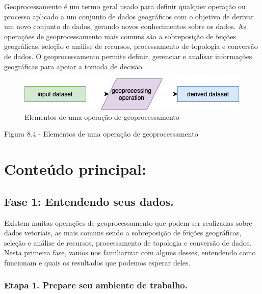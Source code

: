 \documentclass[
]{book}
\begin{document}
Geoprocessamento é um termo geral usado para definir qualquer operação ou processo aplicado a um conjunto de dados geográficos com o objetivo de derivar um novo conjunto de dados, gerando novos conhecimentos sobre os dados. As operações de geoprocessamento mais comuns são a sobreposição de feições geográficas, seleção e análise de recursos, processamento de topologia e conversão de dados. O geoprocessamento permite definir, gerenciar e analisar informações geográficas para apoiar a tomada de decisão.

\begin{figure}
\centering
\includegraphics{media/modulo8/fig84.png}
\caption{Elementos de uma operação de geoprocessamento}
\end{figure}

Figura 8.4 - Elementos de uma operação de geoprocessamento

\hypertarget{conteuxfado-principal-7}{%
\section{Conteúdo principal:}\label{conteuxfado-principal-7}}

\hypertarget{fase-1-entendendo-seus-dados.}{%
\subsection{Fase 1: Entendendo seus dados.}\label{fase-1-entendendo-seus-dados.}}

Existem muitas operações de geoprocessamento que podem ser realizadas sobre dados vetoriais, as mais comuns sendo a sobreposição de feições geográficas, seleção e análise de recursos, processamento de topologia e conversão de dados. Nesta primeira fase, vamos nos familiarizar com alguns desses, entendendo como funcionam e quais os resultados que podemos esperar deles.

\hypertarget{etapa-1.-prepare-seu-ambiente-de-trabalho.}{%
\subsubsection{\texorpdfstring{\textbf{Etapa 1. Prepare seu ambiente de trabalho.}}{Etapa 1. Prepare seu ambiente de trabalho.}}\label{etapa-1.-prepare-seu-ambiente-de-trabalho.}}
\end{document}
